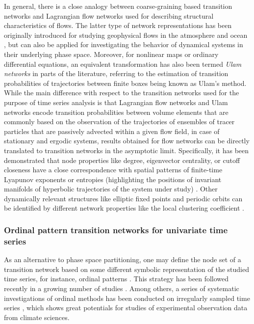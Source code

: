 In general, there is a close analogy between coarse-graining based transition networks and Lagrangian flow networks \cite{Lindner2017,Donner2019} used for describing structural characteristics of flows. The latter type of network representations has been originally introduced for studying geophysical flows in the atmosphere and ocean \cite{Rossi2015,Ser-Giacomi2015}, but can also be applied for investigating the behavior of dynamical systems in their underlying phase space. Moreover, for nonlinear maps or ordinary differential equations, an equivalent transformation has also been termed \emph{Ulam networks} \cite{Shepelyansky2010,Ermann2010,Chakhmakhchyan2013,Ermann2015,Frahm2018} in parts of the literature, referring to the estimation of transition probabilities of trajectories between finite boxes being known as Ulam's method. While the main difference with respect to the transition networks used for the purpose of time series analysis is that Lagrangian flow networks and Ulam networks encode transition probabilities between volume elements that are commonly based on the observation of the trajectories of ensembles of tracer particles that are passively advected within a given flow field, in case of stationary and ergodic systems, results obtained for flow networks can be directly translated to transition networks in the asymptotic limit. Specifically, it has been demonstrated that node properties like degree, eigenvector centrality, or cutoff closeness have a close correspondence with spatial patterns of finite-time Lyapunov exponents or entropies (highlighting the positions of invariant manifolds of hyperbolic trajectories of the system under study) \cite{Ser-Giacomi2015,Lindner2017}. Other dynamically relevant structures like elliptic fixed points and periodic orbits can be identified by different network properties like the local clustering coefficient \cite{Rodriguez-Mendez2017}.


		\subsubsection{Ordinal pattern transition networks for univariate time series} \label{sec:OPtransition}
		As an alternative to phase space partitioning, one may define the node set of a transition network based on some different symbolic representation of the studied time series, for instance, ordinal patterns \cite{Li2008,McCullough2015}. This strategy has been followed recently in a growing number of studies \cite{Small2013,McCullough2015,Kulp2016b,McCullough2017b,Small2018}. Among others, a series of systematic investigations of ordinal methods has been conducted on irregularly sampled time series \cite{Kulp2016a,McCullough2016,Sakellariou2016}, which shows great potentials for studies of experimental observation data from climate sciences. 

